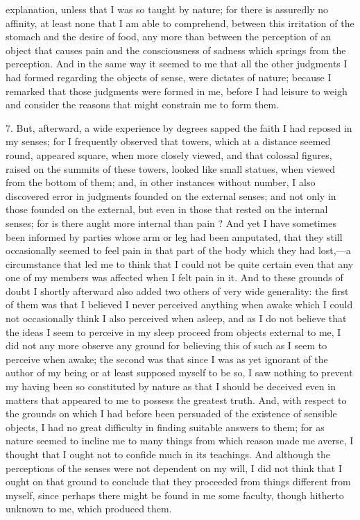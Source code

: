 explanation, unless that I was so taught by nature; for there is assuredly no affinity, at least none that I am able to comprehend, between this irritation of the stomach and the desire of food, any more than between the perception of an object that causes pain and the consciousness of sadness which springs from the perception. And in the same way it seemed to me that all the other judgments I had formed regarding the objects of sense, were dictates of nature; because I remarked that those judgments were formed in me, before I had leisure to weigh and consider the reasons that might constrain me to form them.

7. But, afterward, a wide experience by degrees sapped the faith I had reposed in my senses; for I frequently observed that towers, which at a distance seemed round, appeared square, when more closely viewed, and that colossal figures, raised on the summits of these towers, looked like small statues, when viewed from the bottom of them; and, in other instances without number, I also discovered error in judgments founded on the external senses; and not only in those founded on the external, but even in those that rested on the internal senses; for is there aught more internal than pain ? And yet I have sometimes been informed by parties whose arm or leg had been amputated, that they still occasionally seemed to feel pain in that part of the body which they had lost,—a circumstance that led me to think that I could not be quite certain even that any one of my members was affected when I felt pain in it. And to these grounds of doubt I shortly afterward also added two others of very wide generality: the first of them was that I believed I never perceived anything when awake which I could not occasionally think I also perceived when asleep, and as I do not believe that the ideas I seem to perceive in my sleep proceed from objects external to me, I did not any more observe any ground for believing this of such as I seem to perceive when awake; the second was that since I was as yet ignorant of the author of my being or at least supposed myself to be so, I saw nothing to prevent my having been so constituted by nature as that I should be deceived even in matters that appeared to me to possess the greatest truth. And, with respect to the grounds on which I had before been persuaded of the existence of sensible objects, I had no great difficulty in finding suitable answers to them; for as nature seemed to incline me to many things from which reason made me averse, I thought that I ought not to confide much in its teachings. And although the perceptions of the senses were not dependent on my will, I did not think that I ought on that ground to conclude that they proceeded from things different from myself, since perhaps there might be found in me some faculty, though hitherto unknown to me, which produced them.

